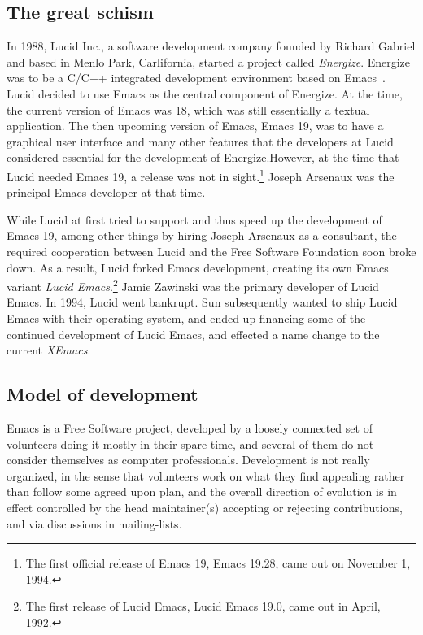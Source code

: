 \documentclass[format=acmsmall, review]{acmart}
\begin{document}
\subsection{The great schism}

In 1988, Lucid Inc., a software development company founded by Richard
Gabriel and based in Menlo
Park, Carlifornia, started a project called \emph{Energize}.
Energize was to be a C/C++ integrated development environment based on
Emacs~\cite{GabrielLetter}.  Lucid decided to use Emacs as the central
component of Energize.  At the time, the current version of Emacs was
18, which was still essentially a textual application.  The then
upcoming version of Emacs, Emacs 19, was to have a graphical user
interface and many other features that the developers at Lucid
considered essential for the development of Energize.However, at the
time that Lucid needed Emacs 19, a release was not in
sight.\footnote{The first official release of Emacs 19, Emacs
  19.28, came out on November 1, 1994.}  Joseph Arsenaux was
the principal Emacs developer at that time.

While Lucid at first tried to support and thus speed up the
development of Emacs 19, among other things by hiring Joseph Arsenaux as
a consultant, the required cooperation between Lucid and
the Free Software Foundation soon broke down.  As a result, Lucid
forked Emacs development, creating its own Emacs variant \emph{Lucid
Emacs}.\footnote{The first release of Lucid Emacs, Lucid Emacs 19.0, came out in April,
1992.}  Jamie Zawinski was the primary developer of Lucid Emacs.
In 1994, Lucid went bankrupt.  Sun subsequently wanted to ship
Lucid Emacs with their operating system, and ended up financing some
of the continued development of Lucid Emacs, and effected a name
change to the current \emph{XEmacs}.

\subsection{Model of development}

Emacs is a Free Software project, developed by a loosely connected
set of volunteers doing it mostly in their spare time, and several of them
do not consider themselves as computer professionals.  Development is not
really organized, in the sense that volunteers work on what they find
appealing rather than follow some agreed upon plan, and the overall
direction of evolution is in effect controlled by the head maintainer(s)
accepting or rejecting contributions, and via discussions in mailing-lists.
\end{document}
